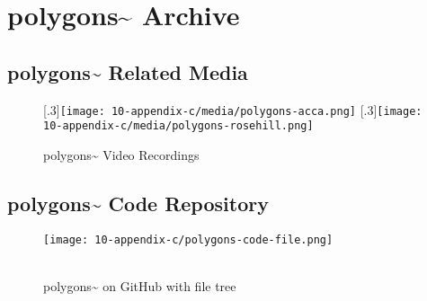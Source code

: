 \chapter{polygons\textasciitilde{} Archive}\label{sec: appendix-c}

\section{polygons\textasciitilde{} Related Media}
\begin{figure}[!ht]
    \centering
    [.3\linewidth]{\texttt{[image: 10-appendix-c/media/polygons-acca.png]}}
    \hspace*{2cm}
    [.3\linewidth]{\texttt{[image: 10-appendix-c/media/polygons-rosehill.png]}}
    \caption*{polygons\textasciitilde{} Video Recordings}\label{sec: appendix-c-media}
\end{figure}
\clearpage


\section{polygons\textasciitilde{} Code Repository}
\begin{figure}[!ht]
    \texttt{[image: 10-appendix-c/polygons-code-file.png]}
    \caption*{ \\ polygons\textasciitilde{} on GitHub with file tree}\label{sec: appendix-c-code}
\end{figure}
\clearpage



